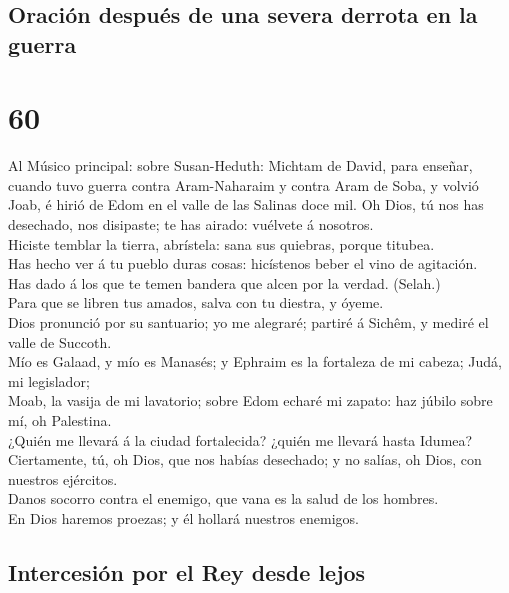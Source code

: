 \hypertarget{oraciuxf3n-despuuxe9s-de-una-severa-derrota-en-la-guerra}{%
\subsection{Oración después de una severa derrota en la
guerra}\label{oraciuxf3n-despuuxe9s-de-una-severa-derrota-en-la-guerra}}

\hypertarget{section-19-60}{%
\section{60}\label{section-19-60}}

 Al Músico principal: sobre Susan-Heduth: Michtam de
David, para enseñar, cuando tuvo guerra contra Aram-Naharaim y contra
Aram de Soba, y volvió Joab, é hirió de Edom en el valle de las Salinas
doce mil. Oh Dios, tú nos has desechado, nos disipaste; te has airado:
vuélvete á nosotros.\\
 Hiciste temblar la tierra, abrístela: sana sus quiebras,
porque titubea.\\
 Has hecho ver á tu pueblo duras cosas: hicístenos beber
el vino de agitación.\\
 Has dado á los que te temen bandera que alcen por la
verdad. (Selah.)\\
 Para que se libren tus amados, salva con tu diestra, y
óyeme.\\
 Dios pronunció por su santuario; yo me alegraré; partiré
á Sichêm, y mediré el valle de Succoth.\\
 Mío es Galaad, y mío es Manasés; y Ephraim es la
fortaleza de mi cabeza; Judá, mi legislador;\\
 Moab, la vasija de mi lavatorio; sobre Edom echaré mi
zapato: haz júbilo sobre mí, oh Palestina.\\
 ¿Quién me llevará á la ciudad fortalecida? ¿quién me
llevará hasta Idumea?\\
 Ciertamente, tú, oh Dios, que nos habías desechado; y no
salías, oh Dios, con nuestros ejércitos.\\
 Danos socorro contra el enemigo, que vana es la salud de
los hombres.\\
 En Dios haremos proezas; y él hollará nuestros enemigos.

\hypertarget{intercesiuxf3n-por-el-rey-desde-lejos}{%
\subsection{Intercesión por el Rey desde
lejos}\label{intercesiuxf3n-por-el-rey-desde-lejos}}

